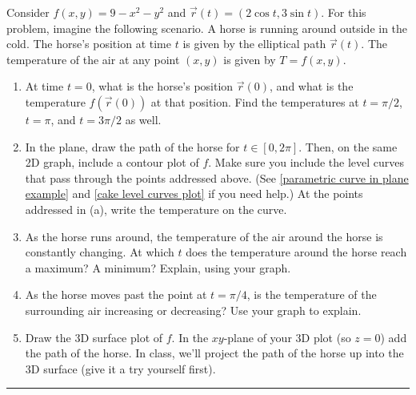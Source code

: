 \begin{problem}
 Consider $f(x,y)=9-x^2-y^2$ and $\vec r(t)=(2\cos t, 3\sin t)$. For this problem, imagine the following scenario.  A horse is running around outside in the cold. The horse's position at time $t$ is given by the elliptical path $\vec r(t)$. The temperature of the air at any point $(x,y)$ is given by $T=f(x,y)$.  
\begin{enumerate}
 \item At time $t=0$, what is the horse's position $\vec r(0)$, and what is the temperature $f(\vec r(0))$ at that position. Find the temperatures at $t=\pi/2$, $t=\pi$, and $t=3\pi/2$ as well. 
 \item In the plane, draw the path of the horse for $t\in [0,2\pi]$. Then, on the same 2D graph, include a contour plot of $f$. Make sure you include the level curves that pass through the points addressed above. (See  \ref{parametric curve in plane example} and \ref{cake level curves plot} if you need help.) At the points addressed in (a), write the temperature on the curve.
 \item{}%
 As the horse runs around, the temperature of the air around the horse is constantly changing. 
At which $t$ does the temperature around the horse reach a maximum?  A minimum?  Explain, using your graph. 
 \item As the horse moves past the point at $t=\pi/4$, is the temperature of the surrounding air increasing or decreasing? Use your graph to explain.
 \item Draw the 3D surface plot of $f$. In the $xy$-plane of your 3D plot (so $z=0$) add the path of the horse. In class, we'll project the path of the horse up into the 3D surface (give it a try yourself first). 
\end{enumerate}
\hrule\end{problem}

